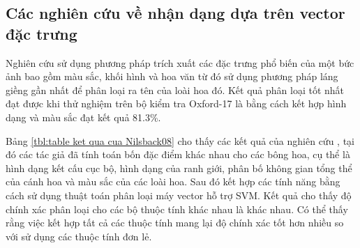 \documentclass[12pt]{report}
\begin{document}
		\subsection{Các nghiên cứu về nhận dạng dựa trên vector đặc trưng}
																																																
																																																
		Nghiên cứu \cite{cia-Nilsback06} sử dụng phương pháp trích xuất các đặc trưng phổ biến của một bức ảnh bao gồm màu sắc, khối hình và hoa văn từ đó sử dụng phương pháp láng giềng gần nhất để phân loại ra tên của loài hoa đó. Kết quả phân loại tốt nhất đạt được khi thử nghiệm trên bộ kiểm tra Oxford-17 là bằng cách kết hợp hình dạng và màu sắc đạt kết quả 81.3\%.
																																																
		Bảng \ref{tbl:table ket qua cua Nilsback08} cho thấy các kết quả của nghiên cứu \cite{cia-Nilsback08}, tại đó các tác giả đã tính toán bốn đặc điểm khác nhau cho các bông hoa, cụ thể là hình dạng kết cấu cục bộ, hình dạng của ranh giới, phân bố không gian tổng thể của cánh hoa và màu sắc của các loài hoa. Sau đó kết hợp các tính năng bằng cách sử dụng thuật toán phân loại máy vector hỗ trợ SVM. Kết quả cho thấy độ chính xác phân loại cho các bộ thuộc tính khác nhau là khác nhau. Có thể thấy rằng việc kết hợp tất cả các thuộc tính mang lại độ chính xác tốt hơn nhiều so với sử dụng các thuộc tính đơn lẻ.
																																												
\end{document}
